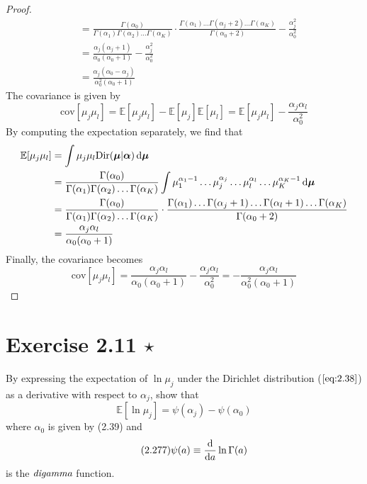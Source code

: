 \begin{proof}
\begin{align*}
        &= \frac{\Gamma(\alpha_0)}{\Gamma(\alpha_1)\Gamma(\alpha_2)\ldots\Gamma(\alpha_K)}
        \cdot \frac{\Gamma(\alpha_1)\ldots\Gamma(\alpha_j + 2)\ldots\Gamma(\alpha_K)}
        {\Gamma(\alpha_0 + 2)} - \frac{\alpha_j^2}{\alpha_0^2} \\
        &= \frac{\alpha_j(\alpha_j + 1)}{\alpha_0(\alpha_0 + 1)} - \frac{\alpha_j^2}{\alpha_0^2} \\
        &= \frac{\alpha_j(\alpha_0 - \alpha_j)}{\alpha_0^2(\alpha_0 + 1)}
        \tag{2.275}
    \end{align*}
    The covariance is given by
    \[
    \text{cov}[\mu_j\mu_l] 
    = \mathbb{E}[\mu_j\mu_l] - \mathbb{E}[\mu_j]\mathbb{E}[\mu_l]
    = \mathbb{E}[\mu_j\mu_l] - \frac{\alpha_j\alpha_l}{\alpha_0^2}
    \] 
    By computing the expectation separately, we find that
    \begin{align*}
        \mathbb{E}[\mu_j\mu_l]
        &= \int \mu_j\mu_l \text{Dir}(\bm{\mu} | \bm{\alpha}) \mathop{}\!\mathrm{d} \bm{\mu} \\
        &= \frac{\Gamma(\alpha_0)}{\Gamma(\alpha_1)\Gamma(\alpha_2)\ldots\Gamma(\alpha_K)}
        \int \mu_1^{\alpha_1 - 1}\dots\mu_j^{\alpha_j}\ldots\mu_l^{\alpha_l}
        \ldots\mu_K^{\alpha_K - 1} \mathop{}\!\mathrm{d} \bm{\mu} \\
        &= \frac{\Gamma(\alpha_0)}{\Gamma(\alpha_1)\Gamma(\alpha_2)\ldots\Gamma(\alpha_K)}
        \cdot \frac{\Gamma(\alpha_1)\ldots\Gamma(\alpha_j + 1)\ldots\Gamma(\alpha_l + 1)\ldots
        \Gamma(\alpha_K)}{\Gamma(\alpha_0 + 2)}\\
        &= \frac{\alpha_j\alpha_l}{\alpha_0(\alpha_0 + 1)}
    \end{align*}
    Finally, the covariance becomes
    \[
        \text{cov}[\mu_j\mu_l] 
        = \frac{\alpha_j\alpha_l}{\alpha_0(\alpha_0 + 1)} - \frac{\alpha_j\alpha_l}{\alpha_0^2}
        = -\frac{\alpha_j\alpha_l}{\alpha_0^2(\alpha_0 + 1)}
        \tag{2.275}
    \] 
\end{proof}

\section*{Exercise 2.11 $\star$}
By expressing the expectation of $\ln \mu_j$ under the Dirichlet
distribution ($\ref{eq:2.38}$) as a derivative with respect
to $\alpha_j$, show that
\begin{equation}\label{eq:2.276}\tag{2.276}
    \mathbb{E}[\ln \mu_j] = \psi(\alpha_j) - \psi(\alpha_0)
\end{equation}
where $\alpha_0$ is given by (2.39) and
\begin{equation}\label{eq:2.277}\tag{2.277}
    \psi(a) \equiv \dv{a} \ln \Gamma(a)
\end{equation}
is the $\emph{digamma}$ function.

